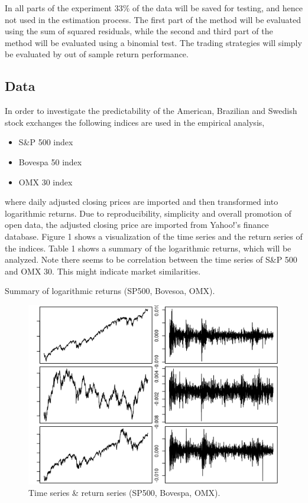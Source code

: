 \documentclass[12pt, letterpaper]{amsart}%
\begin{document}
In all parts of the experiment 33\% of the data will be saved for testing, and hence not used in the estimation process. The first part of the method will be evaluated using the sum of squared residuals, while the second and third part of the method will be evaluated using a binomial test. The trading strategies will simply be evaluated by out of sample return performance.

\subsection{Data}
In order to investigate the predictability of the American, Brazilian and Swedish stock exchanges the following indices are used in the empirical analysis,

\begin{itemize}  
\item S\&P 500 index
\item Bovespa 50 index
\item OMX 30 index
\end{itemize}

where daily adjusted closing prices are imported and then transformed into logarithmic returns. Due to reproducibility, simplicity and overall promotion of open data, the adjusted closing price are imported from Yahoo!'s finance database. Figure 1 shows a visualization of the time series and the return series of the indices. Table 1 shows a summary of the logarithmic returns, which will be analyzed. Note there seems to be correlation between the time series of S\&P 500 and OMX 30. This might indicate market similarities.

\begin{table}[H]
\centering
\caption{Summary of logarithmic returns (SP500, Bovesoa, OMX).}
\end{table}

\begin{figure}[H]
\caption{Time series \& return series (SP500, Bovespa, OMX).}
\centering
\includegraphics[scale=0.6]{data.png}
\end{figure}
\end{document}
